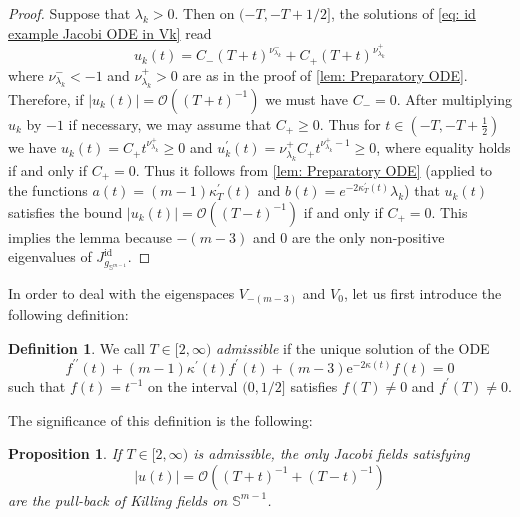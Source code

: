 \documentclass{article}
\numberwithin{equation}{section}        %
\theoremstyle{bfnote}
\newtheorem{prop}[thm]{Proposition}         %
\theoremstyle{definition}
\newtheorem{Def}[thm]{Definition}           %
\theoremstyle{bfremark}
\newcommand{\Sp}{\mathbb{S}}                %
\DeclareMathOperator{\id}{id}                   %
\begin{document}
\begin{proof}
    Suppose that $\lambda_k > 0$. Then on $(-T,-T+1/2]$, the solutions of \eqref{eq: id example Jacobi ODE in Vk} read
\begin{equation*}
    u_k(t) = C_- (T+t)^{\nu^-_{\lambda_k}} + C_+ (T+t)^{\nu^+_{\lambda_k}}
\end{equation*}
where $\nu^-_{\lambda_k} < -1$ and $\nu^+_{\lambda_k} > 0$ are as in the proof of \cref{lem: Preparatory ODE}. Therefore, if $|u_k(t)| = \mathcal{O}((T+t)^{-1})$ we must have $C_- = 0$. After multiplying $u_k$ by $-1$ if necessary, we may assume that $C_+ \geq 0$. Thus for $t \in (-T,-T+\frac{1}{2})$ we have $u_k(t) = C_+ t^{\nu^+_{\lambda_k}} \geq 0$ and $u_k^\prime(t) = \nu^+_{\lambda_k} C_+ t^{\nu^+_{\lambda_k}-1} \geq 0$, where equality holds if and only if $C_+ = 0$. Thus it follows from \cref{lem: Preparatory ODE} (applied to the functions $a(t) = (m-1)\kappa^\prime_T(t)$ and $b(t) = e^{-2\kappa^\prime_T(t)}\lambda_k$) that $u_k(t)$ satisfies the bound $|u_k(t)| = \mathcal{O}((T-t)^{-1})$ if and only if $C_+ = 0$. This implies the lemma because $-(m-3)$ and $0$ are the only non-positive eigenvalues of $J^{\id}_{g_{\Sp^{m-1}}}$.
\end{proof}

In order to deal with the eigenspaces $V_{-(m-3)}$ and $V_0$, let us first introduce the following definition:

\begin{Def}
    We call $T \in [2,\infty)$ \emph{admissible} if the unique solution of the ODE
    \begin{equation*}
        f^{\prime\prime}(t) + (m-1)\kappa^\prime(t) f^\prime(t) + (m-3) \mathrm{e}^{-2\kappa(t)} f(t) = 0
    \end{equation*}
    such that $f(t) = t^{-1}$ on the interval $(0,1/2]$ satisfies $f(T) \neq 0$ and $f^\prime(T) \neq 0$. 
\end{Def}

The significance of this definition is the following:

\begin{prop}        \label{prop: Existence for identity}
    If $T \in [2,\infty)$ is admissible, the only Jacobi fields satisfying 
    \begin{equation*}
        |u(t)| = \mathcal{O}((T+t)^{-1}+(T-t)^{-1}) 
    \end{equation*}
    are the pull-back of Killing fields on $\Sp^{m-1}$.
\end{prop}
\end{document}
